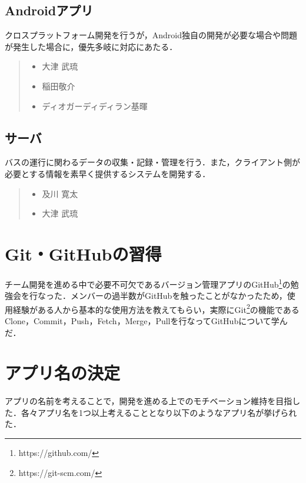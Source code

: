 \subsection{Androidアプリ}
クロスプラットフォーム開発を行うが，Android独自の開発が必要な場合や問題が発生した場合に，優先多岐に対応にあたる．
\begin{quote}
    \begin{itemize}
        \item 大津 武琉
        \item 稲田敬介
        \item ディオガーディディラン基暉
    \end{itemize}
\end{quote}

\subsection{サーバ}
バスの運行に関わるデータの収集・記録・管理を行う．また，クライアント側が必要とする情報を素早く提供するシステムを開発する．
\begin{quote}
    \begin{itemize}
        \item 及川 寛太
        \item 大津 武琉
    \end{itemize}
\end{quote}

\section{Git・GitHubの習得}
チーム開発を進める中で必要不可欠であるバージョン管理アプリのGitHub\footnote{https://github.com/}の勉強会を行なった．メンバーの過半数がGitHubを触ったことがなかったため，使用経験がある人から基本的な使用方法を教えてもらい，実際にGit\footnote{https://git-scm.com/}の機能であるClone，Commit，Push，Fetch，Merge，Pullを行なってGitHubについて学んだ．

\section{アプリ名の決定}
アプリの名前を考えることで，開発を進める上でのモチベーション維持を目指した．各々アプリ名を1つ以上考えることとなり以下のようなアプリ名が挙げられた．

